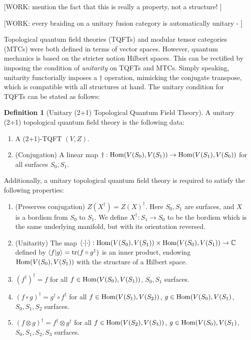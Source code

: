 \documentclass{article}
\theoremstyle{definition}
\newtheorem*{definition}{Definition}
\numberwithin{figure}{section}
\begin{document}
[WORK: mention the fact that this is really a property, not a structure! \cite{reutter2023uniqueness}]

[WORK: every braiding on a unitary fusion category is automatically unitary - \cite{galindo2014braided}]

Topological quantum field theories (TQFTs) and modular tensor categories (MTCs) were both defined in terms of vector spaces. However, quantum mechanics is based on the stricter notion Hilbert spaces. This can be rectified by imposing the condition of \textit{unitarity} on TQFTs and MTCs. Simply speaking, unitarity functorially imposes a $\dagger$ operation, mimicking the conjugate transpose, which is compatible with all structures at hand. The unitary condition for TQFTs can be stated as follows:

\begin{definition}[Unitary (2+1) Topological Quantum Field Theory] A unitary (2+1) topological quantum field theory is the following data:

\begin{enumerate}
\item A (2+1)-TQFT $(V,Z)$.
\item (Conjugation) A linear map $\dagger: \mathrm{Hom}(V(S_0),V(S_1))\to \mathrm{Hom}(V(S_1),V(S_0))$ for all surfaces $S_0,S_1$.
\end{enumerate}

Additionally, a unitary topological quantum field theory is required to satisfy the following properties:

\begin{enumerate}

\item (Preserves conjugation) $Z\left(X^{\dagger}\right)=Z(X)^{\dagger}$. Here $S_0,S_1$ are surfaces, and $X$ is a bordism from $S_0$ to $S_1$. We define $X^{\dagger}:S_1\to S_0$ to be the bordism which is the same underlying manifold, but with its orientation reversed.

\item (Unitarity) The map $\left<\cdot|\cdot \right>: \mathrm{Hom}(V(S_0),V(S_1))\times \mathrm{Hom}(V(S_0),V(S_1))\to \mathbb{C}$ defined by $\left<f|g\right>=\mathrm{tr}(f\circ g^\dagger)$ is an inner product, endowing $\mathrm{Hom}(V(S_0),V(S_1))$ with the structure of a Hilbert space.

\item $(f^{\dagger})^{\dagger}=f$ for all $f\in \mathrm{Hom}(V(S_0),V(S_1))$, $S_0,S_1$ surfaces.

\item $(f\circ g)^{\dagger}=g^{\dagger}\circ f^{\dagger}$ for all $f\in \mathrm{Hom}(V(S_1),V(S_2))$, $g\in \mathrm{Hom}(V(S_0),V(S_1)$, $S_0,S_1,S_2$ surfaces.

\item $(f\otimes g)^{\dagger}=f^{\dagger}\otimes g^{\dagger}$ for all $f\in \mathrm{Hom}(V(S_2),V(S_3))$, $g\in \mathrm{Hom}(V(S_0),V(S_1)$, $S_0,S_1,S_2,S_3$ surfaces.
\end{enumerate}
\raggedleft\qedsymbol{}
\end{definition}
\end{document}
